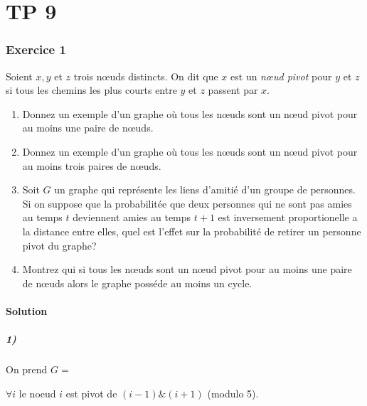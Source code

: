 \chapter*{TP 9}




\subsection*{Exercice 1}
Soient $x, y$ et $z$ trois n\oe{}uds distincts. On dit que $x$ est un \emph{n\oe{}ud pivot} pour $y$ et $z$ si tous les chemins les plus courts entre $y$ et $z$ passent par $x$.

\begin{enumerate}
\item Donnez un exemple d'un graphe o\`{u} tous les n\oe{}uds sont un n\oe{}ud pivot pour au moins une paire de n\oe{}uds.
\item Donnez un exemple d'un graphe o\`{u} tous les n\oe{}uds sont un n\oe{}ud pivot pour au moins trois paires de n\oe{}uds.
\item Soit $G$ un graphe qui repr\'{e}sente les liens d'amiti\'{e} d'un groupe de personnes. Si on suppose que la probabilit\'{e}e que deux personnes qui ne sont pas amies au 
temps $t$ deviennent amies au temps $t + 1$ est inversement proportionelle a la distance entre elles, quel est l'effet sur la probabilit\'{e} de retirer un personne pivot du graphe? 
\item Montrez qui si tous les n\oe{}uds sont un n\oe{}ud pivot pour au moins une paire de n\oe{}uds alors le graphe poss\'{e}de au moins un cycle.
\end{enumerate}

\subsubsection*{Solution}

\paragraph{1)} On prend $G = $
\begin{center}  
\end{center}
$\forall i$ le noeud $i$ est pivot de $(i-1)\&(i+1)$ (modulo 5).

